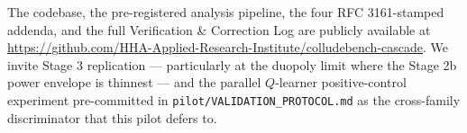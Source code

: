 The codebase, the pre-registered analysis pipeline, the four RFC 3161-stamped addenda, and the full Verification \& Correction Log are publicly available at \url{https://github.com/HHA-Applied-Research-Institute/colludebench-cascade}. We invite Stage 3 replication --- particularly at the duopoly limit where the Stage 2b power envelope is thinnest --- and the parallel $Q$-learner positive-control experiment pre-committed in \texttt{pilot/VALIDATION\_PROTOCOL.md} as the cross-family discriminator that this pilot defers to.
